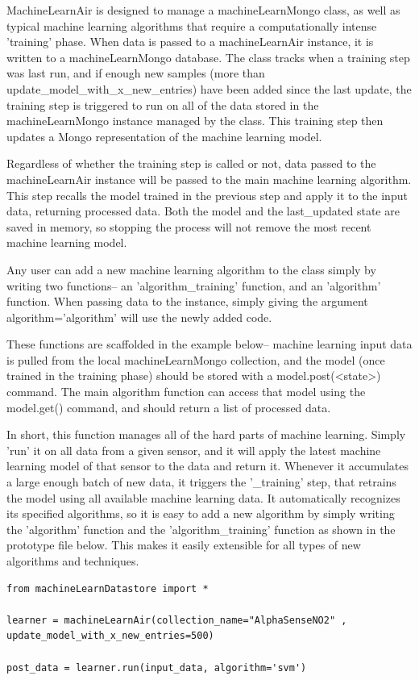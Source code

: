 MachineLearnAir is designed to manage a machineLearnMongo class, as well as typical machine learning algorithms that require a computationally intense 'training' phase.  When data is passed to a machineLearnAir instance, it is written to a machineLearnMongo database.  The class tracks when a training step was last run, and if enough new samples (more than update\_model\_with\_x\_new\_entries) have been added since the last update, the training step is triggered to run on all of the data stored in the machineLearnMongo instance managed by the class.  This training step then updates a Mongo representation of the machine learning model.

Regardless of whether the training step is called or not, data passed to the machineLearnAir instance will be passed to the main machine learning algorithm.  This step recalls the model trained in the previous step and apply it to the input data, returning processed data.  Both the model and the last\_updated state are saved in memory, so stopping the process will not remove the most recent machine learning model.

Any user can add a new machine learning algorithm to the class simply by writing two functions-- an 'algorithm\_training' function, and an 'algorithm' function.  When passing data to the instance, simply giving the argument algorithm='algorithm' will use the newly added code.

These functions are scaffolded in the example below-- machine learning input data is pulled from the local machineLearnMongo collection, and the model (once trained in the training phase) should be stored with a model.post(<state>) command.  The main algorithm function can access that model using the model.get() command, and should return a list of processed data.

In short, this function manages all of the hard parts of machine learning.  Simply 'run' it on all data from a given sensor, and it will apply the latest machine learning model of that sensor to the data and return it.  Whenever it accumulates a large enough batch of new data, it triggers the '\_training' step, that retrains the model using all available machine learning data.  It automatically recognizes its specified algorithms, so it is easy to add a new algorithm by simply writing the 'algorithm' function and the 'algorithm\_training' function as shown in the prototype file below. This makes it easily extensible for all types of new algorithms and techniques.
   

\begin{lstlisting}[style=code]
from machineLearnDatastore import *

learner = machineLearnAir(collection_name="AlphaSenseNO2" , update_model_with_x_new_entries=500)  

post_data = learner.run(input_data, algorithm='svm')
\end{lstlisting}


